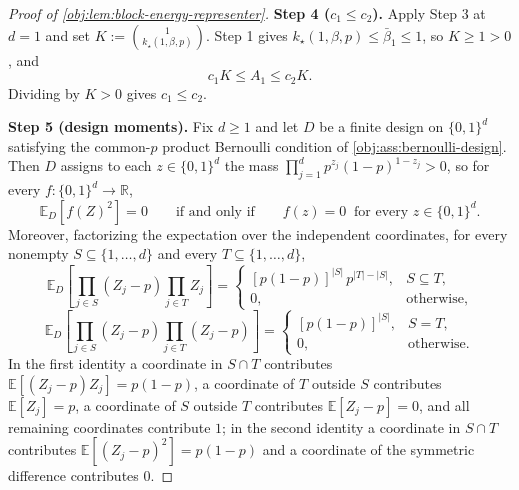 \begin{proof}[Proof of \cref{obj:lem:block-energy-representer}]
\textbf{Step 4 (\(c_1\le c_2\)).}
Apply Step 3 at \(d=1\) and set \(K:=\binom{1}{k_\star(1,\beta,p)}\).  Step 1 gives \(k_\star(1,\beta,p)\le\bar\beta_1\le1\), so \(K\ge1>0\), and
\[
c_1K\le A_1\le c_2K .
\]
Dividing by \(K>0\) gives \(c_1\le c_2\). %

\textbf{Step 5 (design moments).}
Fix \(d\ge1\) and let \(D\) be a finite design on \(\{0,1\}^d\) satisfying the common-\(p\) product Bernoulli condition of \cref{obj:ass:bernoulli-design}.  Then \(D\) assigns to each \(z\in\{0,1\}^d\) the mass \(\prod_{j=1}^d p^{z_j}(1-p)^{1-z_j}>0\), so for every \(f:\{0,1\}^d\to\mathbb R\),
\[
\mathbb E_D[f(Z)^2]=0
\qquad\text{if and only if}\qquad
f(z)=0\ \text{ for every } z\in\{0,1\}^d .
\]
Moreover, factorizing the expectation over the independent coordinates, for every nonempty \(S\subseteq\{1,\ldots,d\}\) and every \(T\subseteq\{1,\ldots,d\}\),
\[
\mathbb E_D\!\left[\prod_{j\in S}(Z_j-p)\prod_{j\in T}Z_j\right]
=
\begin{cases}
[p(1-p)]^{|S|}\,p^{|T|-|S|}, & S\subseteq T,\\
0, & \text{otherwise},
\end{cases}
\]
\[
\mathbb E_D\!\left[\prod_{j\in S}(Z_j-p)\prod_{j\in T}(Z_j-p)\right]
=
\begin{cases}
[p(1-p)]^{|S|}, & S=T,\\
0, & \text{otherwise}.
\end{cases}
\]
In the first identity a coordinate in \(S\cap T\) contributes \(\mathbb E[(Z_j-p)Z_j]=p(1-p)\), a coordinate of \(T\) outside \(S\) contributes \(\mathbb E[Z_j]=p\), a coordinate of \(S\) outside \(T\) contributes \(\mathbb E[Z_j-p]=0\), and all remaining coordinates contribute \(1\); in the second identity a coordinate in \(S\cap T\) contributes \(\mathbb E[(Z_j-p)^2]=p(1-p)\) and a coordinate of the symmetric difference contributes \(0\). %


\end{proof}
